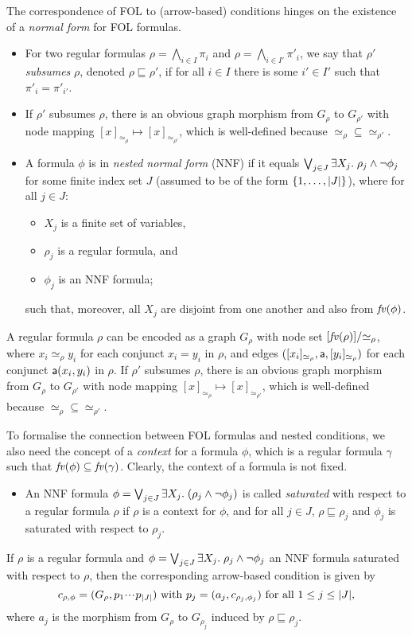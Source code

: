 The correspondence of FOL to (arrow-based) conditions hinges on the existence of a \emph{normal form} for FOL formulas.
%
\begin{itemize}
\item For two regular formulas $\rho=\bigwedge_{i\in I} \pi_i$ and $\rho=\bigwedge_{i\in I'} \pi'_i$, we say that $\rho'$ \emph{subsumes} $\rho$, denoted $\rho\sqsubseteq \rho'$, if for all $i\in I$ there is some $i'\in I'$ such that $\pi'_i=\pi'_{i'}$.

\item If $\rho'$ subsumes $\rho$, there is an obvious graph morphism from $G_\rho$ to $G_{\rho'}$ with node mapping $[x]_{\simeq_\rho}\mapsto [x]_{\simeq_{\rho'}}$, which is well-defined because ${\simeq_\rho}\subseteq {\simeq_{\rho'}}$.

\item A formula $\phi$ is in \emph{nested normal form} (NNF) if it equals $\bigvee_{j\in J} \exists X_j.\; \rho_j\wedge\neg \phi_j$ for some finite index set $J$ (assumed to be of the form $\{{1,\ldots,|J|}\}$), where for all $j\in J$:
\begin{itemize}
\item $X_j$ is a finite set of variables,
\item $\rho_j$ is a regular formula, and
\item $\phi_j$ is an NNF formula;
\end{itemize}
such that, moreover, all $X_j$ are disjoint from one another and also from $\mathit{fv}(\phi)$.
\end{itemize}
%
A regular formula $\rho$ can be encoded as a graph $G_\rho$ with node set $[\mathit{fv}(\rho)]/{\simeq_\rho}$, where $x_i\simeq_\rho y_i$ for each conjunct $x_i=y_i$ in $\rho$, and edges $([x_i]_{\simeq_\rho},\mathsf{a},[y_i]_{\simeq_\rho})$ for each conjunct $\mathsf{a}(x_i,y_i)$ in $\rho$. If $\rho'$ subsumes $\rho$, there is an obvious graph morphism from $G_\rho$ to $G_{\rho'}$ with node mapping $[x]_{\simeq_\rho}\mapsto [x]_{\simeq_{\rho'}}$, which is well-defined because ${\simeq_\rho}\subseteq {\simeq_{\rho'}}$.

To formalise the connection between FOL formulas and nested conditions, we also need the concept of a \emph{context} for a formula $\phi$, which is a regular formula $\gamma$ such that $\mathit{fv}(\phi)\subseteq \mathit{fv}(\gamma)$. Clearly, the context of a formula is not fixed.
%
\begin{itemize}
\item An NNF formula $\phi=\bigvee_{j\in J} \exists X_j.\; (\rho_j\wedge\neg \phi_j)$ is called \emph{saturated} with respect to a regular formula $\rho$ if $\rho$ is a context for $\phi$, and for all $j\in J$, $\rho\sqsubseteq \rho_j$ and $\phi_j$ is saturated with respect to $\rho_j$.
\end{itemize}
%
If $\rho$ is a regular formula and $\phi=\bigvee_{j\in J} \exists X_j.\; \rho_j\wedge\neg \phi_j$ an NNF formula saturated with respect to $\rho$, then the corresponding arrow-based condition is given by
\[ c_{\rho,\phi}=(G_\rho,p_1{\cdotp\mkern-2mu\cdotp\mkern-2mu\cdotp\mkern1mu} p_{|J|}) \text{ with } p_j=(a_j,c_{\rho_j,\phi_j}) \text{ for all $1\leq j\leq |J|$,}
\]
where $a_j$ is the morphism from $G_\rho$ to $G_{\rho_j}$ induced by $\rho\sqsubseteq \rho_j$.
